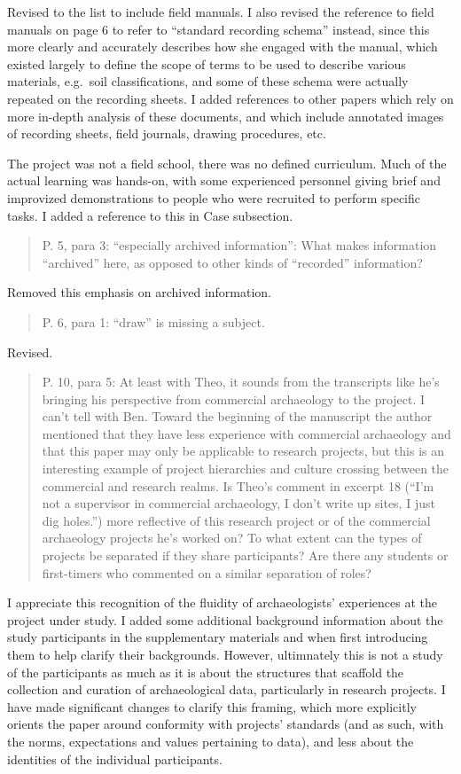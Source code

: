 \documentclass[
]{article}
\begin{document}
Revised to the list to include field manuals. I also revised the
reference to field manuals on page 6 to refer to ``standard recording
schema'' instead, since this more clearly and accurately describes how
she engaged with the manual, which existed largely to define the scope
of terms to be used to describe various materials, e.g.~soil
classifications, and some of these schema were actually repeated on the
recording sheets. I added references to other papers which rely on more
in-depth analysis of these documents, and which include annotated images
of recording sheets, field journals, drawing procedures, etc.

The project was not a field school, there was no defined curriculum.
Much of the actual learning was hands-on, with some experienced
personnel giving brief and improvized demonstrations to people who were
recruited to perform specific tasks. I added a reference to this in Case
subsection.

\begin{quote}
P. 5, para 3: ``especially archived information'': What makes
information ``archived'' here, as opposed to other kinds of ``recorded''
information?
\end{quote}

Removed this emphasis on archived information.

\begin{quote}
P. 6, para 1: ``draw'' is missing a subject.
\end{quote}

Revised.

\begin{quote}
P. 10, para 5: At least with Theo, it sounds from the transcripts like
he's bringing his perspective from commercial archaeology to the
project. I can't tell with Ben. Toward the beginning of the manuscript
the author mentioned that they have less experience with commercial
archaeology and that this paper may only be applicable to research
projects, but this is an interesting example of project hierarchies and
culture crossing between the commercial and research realms. Is Theo's
comment in excerpt 18 (``I'm not a supervisor in commercial archaeology,
I don't write up sites, I just dig holes.'') more reflective of this
research project or of the commercial archaeology projects he's worked
on? To what extent can the types of projects be separated if they share
participants? Are there any students or first-timers who commented on a
similar separation of roles?
\end{quote}

I appreciate this recognition of the fluidity of archaeologists'
experiences at the project under study. I added some additional
background information about the study participants in the supplementary
materials and when first introducing them to help clarify their
backgrounds. However, ultimnately this is not a study of the
participants as much as it is about the structures that scaffold the
collection and curation of archaeological data, particularly in research
projects. I have made significant changes to clarify this framing, which
more explicitly orients the paper around conformity with projects'
standards (and as such, with the norms, expectations and values
pertaining to data), and less about the identities of the individual
participants.
\end{document}
